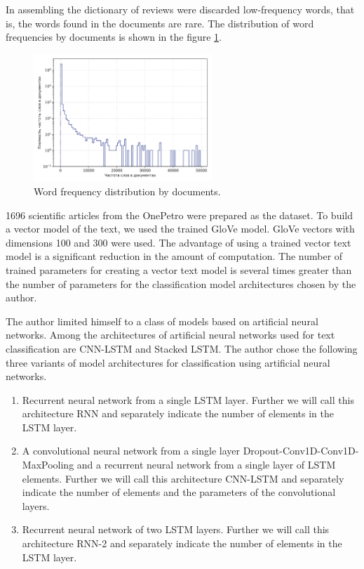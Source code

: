 \documentclass[12pt]{report}
\theoremstyle{definition}
\providecommand{\tightlist}{%
	\setlength{\itemsep}{0pt}\setlength{\parskip}{0pt}}
\begin{document}
In assembling the dictionary of reviews were discarded low-frequency words, that is, the words found in the documents are rare. 
The distribution of word frequencies by documents is shown in the figure \ref{fig:op4_3}.
\begin{figure}[ht]
	\centering
	\includegraphics[width=0.6\textwidth]{op4_3}
	\caption{Word frequency distribution by documents.}
	\label{fig:op4_3}
\end{figure}

1696 scientific articles from the  OnePetro were prepared as the dataset.  
To build a vector model of the text, we used the trained GloVe model. 
GloVe vectors with dimensions 100 and 300 were used. 
The advantage of using a trained vector text model is a significant reduction in the amount of computation.
The number of trained parameters for creating a vector text model is several times greater than the number of parameters for the classification model architectures chosen by the author. 

The author limited himself to a class of models based on artificial neural networks. 
Among the architectures of artificial neural networks used for text classification are CNN-LSTM and Stacked LSTM.  
The author chose the following three variants of model architectures for classification using artificial neural networks.

\begin{enumerate}
	\tightlist
	\item Recurrent neural network from a single LSTM layer. Further we will call this architecture RNN and separately indicate the number of elements in the LSTM layer.
	\item A convolutional neural network from a single layer Dropout-Conv1D-Conv1D-MaxPooling and a recurrent neural network from a single layer of LSTM elements. Further we will call this architecture CNN-LSTM and separately indicate the number of elements and the parameters of the convolutional layers.
	\item Recurrent neural network of two LSTM layers. Further we will call this architecture RNN-2 and separately indicate the number of elements in the LSTM layer.
\end{enumerate}
\end{document}
